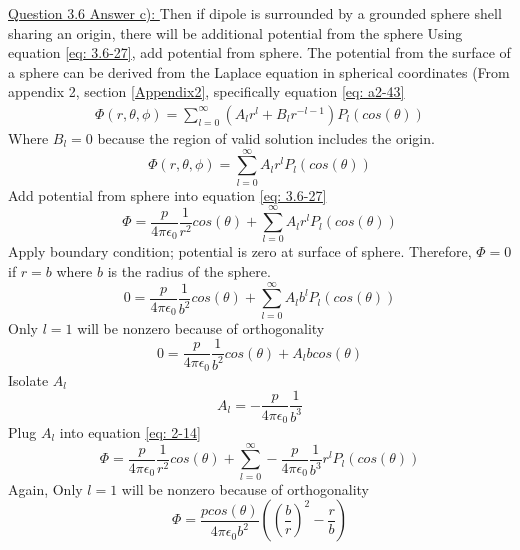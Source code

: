 \documentclass[12pt]{article}
\begin{document}
    \underline{Question 3.6 Answer c): }
    Then if dipole is surrounded by a grounded sphere shell sharing an origin, there will be additional potential from the sphere
    \newline Using equation \ref{eq: 3.6-27}, add potential from sphere. The potential from the surface of a sphere can be derived from the Laplace equation in spherical coordinates (From appendix 2, section \ref{Appendix2}, specifically equation \ref{eq: a2-43}
    \begin{gather*}
        \Phi(r,\theta, \phi) = \sum_{l=0}^\infty (A_l r^l + B_l r^{-l-1}) P_l(cos(\theta))
    \end{gather*}
    Where $B_l=0$ because the region of valid solution includes the origin.
    \begin{equation} \label{eq: eq: 2-13.1}
        \Phi(r,\theta, \phi) = \sum_{l=0}^\infty A_l r^l P_l(cos(\theta))
    \end{equation}
    Add potential from sphere into equation \ref{eq: 3.6-27}
    \begin{equation} \label{eq: 2-14}
        \Phi = \frac{p}{4 \pi \epsilon_0} \frac{1}{r^2} cos(\theta) + \sum_{l=0}^\infty A_l r^l P_l(cos(\theta))
    \end{equation}
    Apply boundary condition; potential is zero at surface of sphere. Therefore, $\Phi=0$ if $r=b$ where $b$ is the radius of the sphere. 
    \begin{equation} \label{eq: 3.6-29}
        0 = \frac{p}{4 \pi \epsilon_0} \frac{1}{b^2} cos(\theta) + \sum_{l=0}^\infty A_l b^l P_l(cos(\theta))
    \end{equation}
    Only $l=1$ will be nonzero because of orthogonality
    \begin{equation} \label{eq: 3.6-30}
        0 = \frac{p}{4 \pi \epsilon_0} \frac{1}{b^2} cos(\theta) + A_l b cos(\theta)
    \end{equation}
    Isolate $A_l$
    \begin{equation} \label{eq: 3.6-31}
        A_l = -\frac{p}{4 \pi \epsilon_0} \frac{1}{b^3}
    \end{equation}
    Plug $A_l$ into equation \ref{eq: 2-14}
    \begin{equation} \label{eq: 3.6-32}
        \Phi = \frac{p}{4 \pi \epsilon_0} \frac{1}{r^2} cos(\theta) + \sum_{l=0}^\infty -\frac{p}{4 \pi \epsilon_0} \frac{1}{b^3} r^l P_l(cos(\theta))
    \end{equation}        
    Again, Only $l=1$ will be nonzero because of orthogonality
    \begin{equation} \label{eq: 3.6-33}
        \Phi = \frac{p cos(\theta)}{4 \pi \epsilon_0 b^2} \left(\left(\frac{b}{r} \right)^2 - \frac{r}{b} \right)
    \end{equation}
    
\end{document}
